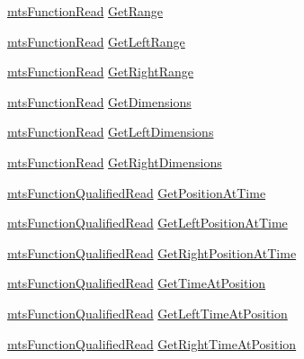 \begin{DoxyCompactItemize}
\item 
\hyperlink{classmts_function_read}{mts\+Function\+Read} \hyperlink{class_i_req_filter_source_video_file_abf207e05262a2eddc499216f06ef84c3}{Get\+Range}
\item 
\hyperlink{classmts_function_read}{mts\+Function\+Read} \hyperlink{class_i_req_filter_source_video_file_ac134bdfc372186b18bedeed815744459}{Get\+Left\+Range}
\item 
\hyperlink{classmts_function_read}{mts\+Function\+Read} \hyperlink{class_i_req_filter_source_video_file_a0c3ed7324a20bfa8f9513a71c1aee475}{Get\+Right\+Range}
\item 
\hyperlink{classmts_function_read}{mts\+Function\+Read} \hyperlink{class_i_req_filter_source_video_file_ae3becb0a4610a1974b2b677908d790f3}{Get\+Dimensions}
\item 
\hyperlink{classmts_function_read}{mts\+Function\+Read} \hyperlink{class_i_req_filter_source_video_file_a827465cd806623505c7dcaa359a9fb26}{Get\+Left\+Dimensions}
\item 
\hyperlink{classmts_function_read}{mts\+Function\+Read} \hyperlink{class_i_req_filter_source_video_file_a8fcb543d369f8e8c5ed59eb9fbfc2282}{Get\+Right\+Dimensions}
\item 
\hyperlink{classmts_function_qualified_read}{mts\+Function\+Qualified\+Read} \hyperlink{class_i_req_filter_source_video_file_a30e8f2209400764469938a24e1f14276}{Get\+Position\+At\+Time}
\item 
\hyperlink{classmts_function_qualified_read}{mts\+Function\+Qualified\+Read} \hyperlink{class_i_req_filter_source_video_file_a3655a5aa1f01feaadeb163549bd2020c}{Get\+Left\+Position\+At\+Time}
\item 
\hyperlink{classmts_function_qualified_read}{mts\+Function\+Qualified\+Read} \hyperlink{class_i_req_filter_source_video_file_a3a81e7e44d8a8b8e30aa682c1369b973}{Get\+Right\+Position\+At\+Time}
\item 
\hyperlink{classmts_function_qualified_read}{mts\+Function\+Qualified\+Read} \hyperlink{class_i_req_filter_source_video_file_aae273434dd6ff54f2718c2b8f7644547}{Get\+Time\+At\+Position}
\item 
\hyperlink{classmts_function_qualified_read}{mts\+Function\+Qualified\+Read} \hyperlink{class_i_req_filter_source_video_file_a2a38c6e743cdf5f55f762c57f238d7d5}{Get\+Left\+Time\+At\+Position}
\item 
\hyperlink{classmts_function_qualified_read}{mts\+Function\+Qualified\+Read} \hyperlink{class_i_req_filter_source_video_file_a76299a34b4f2f3c175b4820117c231ac}{Get\+Right\+Time\+At\+Position}
\end{DoxyCompactItemize}


